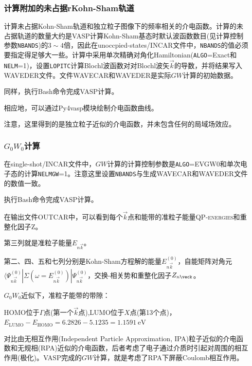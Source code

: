 \subsubsection{计算附加的未占据r\rm{Kohn-Sham}轨道}
计算未占据\textrm{Kohn-Sham}轨道和独立粒子图像下的频率相关的介电函数。计算的未占据轨道的数量大约是\textrm{VASP}计算\textrm{Kohn-Sham}基态时默认波函数数目(见计算控制参数\texttt{NBANDS})的$3\sim4$倍，因此在\textrm{unoccpied-states/INCAR}文件中，\texttt{NBANDS}的值必须要指定得足够大一些。计算中采用单次精确对角化\textrm{Hamiltonian}(\texttt{ALGO}=\textrm{Exact}和\texttt{NELM}=1)，设置\texttt{LOPITC}计算\textrm{Blochl}波函数对对\textrm{Blochl}波矢$\vec k$的导数，并将结果写入\textrm{WAVEDER}文件。文件\textrm{WAVECAR}和\textrm{WAVEDER}是实际$GW$计算的初始数据。

同样，执行\textrm{Bash}命令完成\textrm{VASP}计算。

相应地，可以通过\textrm{Py4vasp}模块绘制介电函数曲线。

注意，这里得到的是独立粒子近似的介电函数，并未包含任何的局域场效应。

\subsubsection{$G_0W_0$计算}
在\textrm{single-shot/INCAR}文件中，$GW$计算的计算控制参数是\texttt{ALGO}=\textrm{EVGW0}和单次电子态的计算\texttt{NELMGW}=1。注意这里设置\texttt{NBANDS}与生成\textrm{WAVECAR}和\textrm{WAVEDER}文件的数值一致。

执行\textrm{Bash}命令完成\textrm{VASP}计算。

在输出文件\textrm{OUTCAR}中，可以看到每个$\vec k$点和能带的准粒子能量\textsc{QP-energies}和重整化因子\textsc{Z}。

第三列就是准粒子能量$E_{n\vec k}$。

第二、四、五和七列分别是\textrm{Kohn-Sham}方程解的能量$E_{n\vec k}^{(0)}$，自能矩阵对角元$\langle\Psi_{n\vec k}^{(0)}|\Sigma(\omega=E_{n\vec k}^{(0)})|\Psi_{n\vec k}^{(0)}$，交换-相关势和重整化因子$Z_{n\veck}$。

$G_0W_0$近似下，准粒子能带的带隙：

\textrm{HOMO}位于$\Gamma$点(第一个$\vec k$点),\textrm{LUMO}位于$X$点(第13个点)，$E_{\mathrm{LUMO}}-E_{\mathrm{HOMO}}=6.2826-5.1235=1.1591~\mathrm{eV}$

对比由无相互作用\textrm{(Independent Particle Approximation, IPA)}粒子近似的介电函数和无规相\textrm{(RPA)}近似的介电函数，后者考虑了电子通过介质时引起对周围的相互作用(极化)。\textrm{VASP}完成的$GW$计算，就是考虑了\textrm{RPA}下屏蔽\textrm{Coulomb}相互作用。

